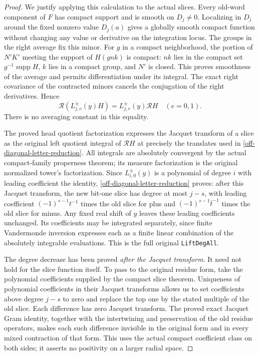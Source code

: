\begin{proof}
We justify applying this calculation to the actual
slices.  Every old-word component of $F$ has compact
support and is smooth on $D_j\ne0$.  Localizing in
$D_j$ around the fixed nonzero value $D_j(a)$ gives
a globally smooth compact function without changing
any value or derivative on the integration locus.
The groups in the right average fix this minor.
For $g$ in a compact neighborhood, the portion of
$N'K'$ meeting the support of $H(gnk)$ is compact:
$nk$ lies in the compact set $g^{-1}\operatorname{supp}H$,
$k$ lies in a compact group, and $N'$ is closed.
This proves smoothness of the average and permits
differentiation under its integral.  The exact right
covariance of the contracted minors cancels the
conjugation of the right derivatives.  Hence
\[
       \mathcal R(L^\pm_{j,e}(y)H)
                    =L^\pm_{j,e}(y)\mathcal R H
                    \quad(e=0,1).
\]
There is no averaging constant in this equality.

The proved head quotient factorization expresses the
Jacquet transform of a slice as the original left
quotient integral of $\mathcal R H$ at precisely the
translates used in \eqref{off-diagonal-letter-reduction}.
All integrals are absolutely convergent by the actual
compact-family properness theorem; its measure
factorization is the original normalized tower's
factorization.  Since $L^\pm_{i,0}(y)$ is a polynomial
of degree $i$ with leading coefficient the identity,
\eqref{off-diagonal-letter-reduction} proves:
after this Jacquet transform, the new bit-one slice
has degree at most $j-s$, with leading coefficient
$(-1)^{s-1}t^{-1}$ times the old slice for plus and
$(-1)^{s-1}\bar t^{-1}$ times the old slice for minus.
Any fixed real shift of $y$ leaves these leading
coefficients unchanged.  Its coefficients may be
integrated separately, since finite Vandermonde
inversion expresses each as a finite linear
combination of the absolutely integrable evaluations.
This is the full original \texttt{LiftDegAll}.

The degree decrease has been proved \emph{after the
Jacquet transform}.  It need not hold for the slice
function itself.  To pass to the original residue
form, take the polynomial coefficients supplied by
the compact slice theorem.  Uniqueness of polynomial
coefficients in their Jacquet transforms allows us
to set coefficients above degree $j-s$ to zero and
replace the top one by the stated multiple of the
old slice.  Each difference has zero Jacquet
transform.  The proved exact Jacquet Gram identity,
together with the intertwining and preservation of
the old residue operators, makes each such difference
invisible in the original form and in every mixed
contraction of that form.  This uses the actual
compact coefficient class on both sides; it asserts
no positivity on a larger radial space.


\end{proof}
